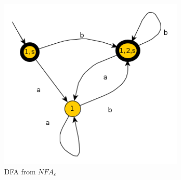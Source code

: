 \documentclass[a4paper]{article}
\begin{document}
        \begin{figure}[H]
            \centering
            \includegraphics[width=0.8\textwidth]{dnanoeps.png}
            \caption{DFA from $NFA_\varepsilon$}
        \end{figure}
\end{document}
